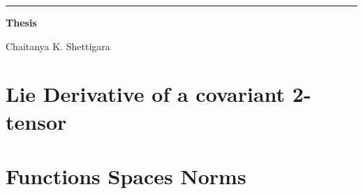 


\begin{titlepage}
\begin{flushleft}
\hrule
\vspace{1 cm}
{\huge{\bf{Thesis}}}


\vspace*{2cm}\vspace{3 cm}
{\large Chaitanya K. Shettigara}

\vspace{0.5 cm}{\today}
\end{flushleft}
\end{titlepage}

\newpage {}
\tableofcontents

\newpage {}






















\appendix
\chapter{Lie Derivative of a covariant 2-tensor}
%
\chapter{Functions Spaces Norms}



 